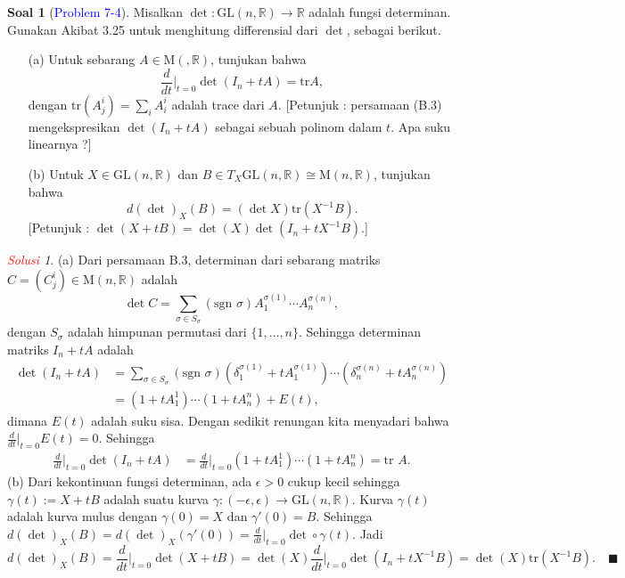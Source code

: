 \documentclass[11pt]{article}
\theoremstyle{definition}
\newtheorem*{problem}{Soal}
\theoremstyle{remark}
\newtheorem*{solution}{\textcolor{red}{Solusi}}
\newcommand{\er}{\mathbb{R}}            %
\begin{document}
\begin{problem}[\textcolor{blue}{Problem 7-4}]
Misalkan $\det : \text{GL}(n,\er) \to \er$ adalah fungsi determinan. Gunakan Akibat 3.25 untuk menghitung differensial dari $\det$, sebagai berikut.
\begin{itemize}
    \item [(a)] Untuk sebarang $A \in \text{M}(, \er)$, tunjukan bahwa
    $$
    \frac{d}{dt}\Big|_{t=0} \det (I_n + tA) = \text{tr} A,
    $$
    dengan $\text{tr}(A^i_j) = \sum_i A^i_i$ adalah trace dari $A$. [Petunjuk : persamaan (B.3) mengekspresikan $\det (I_n +tA)$ sebagai sebuah polinom dalam $t$. Apa suku linearnya ?]
    
    \item [(b)] Untuk $X \in \text{GL}(n,\er)$ dan $B \in T_X \text{GL}(n,\er) \cong \text{M}(n,\er)$, tunjukan bahwa 
    $$
    d(\det)_X(B) = (\det X)  \text{tr} (X^{-1}B).
    $$
    [Petunjuk : $\det(X+tB) = \det(X) \det(I_n+tX^{-1}B)$.]
\end{itemize}
\end{problem}

\begin{solution}
(a) Dari persamaan B.3, determinan dari sebarang matriks $C=(C^i_j) \in \text{M}(n,\er)$ adalah
$$
\det C  = \sum_{\sigma \in S_{\sigma}} (\text{sgn }\sigma) A^{\sigma(1)}_1 \cdots A^{\sigma(n)}_n,
$$
dengan $S_{\sigma}$ adalah himpunan permutasi dari $\{ 1,\dots,n\}$. Sehingga determinan matriks $I_n +tA$ adalah
\begin{align*}
    \det (I_n +tA) &= \sum_{\sigma \in S_{\sigma}} (\text{sgn }\sigma) (\delta^{\sigma(1)}_1+tA^{\sigma(1)}_1) \cdots (\delta^{\sigma(n)}_n+tA^{\sigma(n)}_n) \\
    &= (1+tA^1_1) \cdots (1+tA^n_n) + E(t),
\end{align*}
dimana $E(t)$ adalah suku sisa. Dengan sedikit renungan kita menyadari bahwa $\frac{d}{dt}\big|_{t=0} E(t) = 0$.
Sehingga
\begin{align*}
    \frac{d}{dt}\Big|_{t=0} \det (I_n +tA) &= \frac{d}{dt}\Big|_{t=0} (1+tA^1_1) \cdots (1+tA^n_n) = \text{tr }A.
\end{align*}
(b) Dari kekontinuan fungsi determinan, ada $\epsilon>0$ cukup kecil sehingga $\gamma(t) := X+tB$ adalah suatu kurva $\gamma : (-\epsilon,\epsilon) \to \text{GL}(n,\er)$. Kurva $\gamma(t)$ adalah kurva mulus dengan $\gamma(0) = X$ dan $\gamma'(0)=B$. Sehingga $d(\det)_X(B) = d(\det)_X(\gamma'(0)) = \frac{d}{dt}\big|_{t=0} \det \circ \gamma (t) $. Jadi
$$
d(\det)_X(B) = \frac{d}{dt}\Big|_{t=0} \det (X+tB) = \det(X) \frac{d}{dt}\Big|_{t=0} \det(I_n + tX^{-1}B) = \det(X) \text{tr}(X^{-1}B). \quad \blacksquare
$$
\end{solution}
\end{document}
